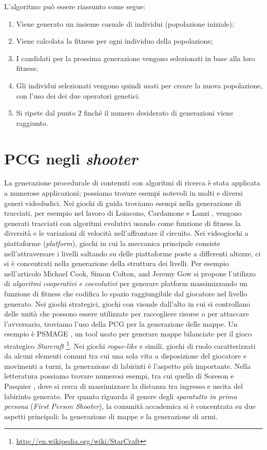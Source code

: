 \documentclass[12pt, italian]{toptesi}
\begin{document}
L'algoritmo può essere riassunto come segue:

\begin{enumerate}
 \item Viene generato un insieme casuale di individui (popolazione iniziale);
 \item Viene calcolata la fitness per ogni individuo della popolazione;
 \item I candidati per la prossima generazione vengono selezionati in base alla loro fitness;
 \item Gli individui selezionati vengono quindi usati per creare la nuova popolazione, con l'uso dei dei due operatori genetici.
 \item Si ripete dal punto 2 finché il numero desiderato di generazioni viene raggiunto.
\end{enumerate}

\section{PCG negli \emph{shooter}}

La generazione procedurale di contenuti con algoritmi di ricerca è stata applicata a numerose applicazioni; possiamo trovare esempi notevoli in molti e diversi generi videoludici.
Nei giochi di guida troviamo esempi nella generazione di tracciati, per esempio nel lavoro di Loiacono, Cardamone e Lanzi \cite{trackgen:article}, vengono generati tracciati con algoritmi evolutivi usando come funzione di fitness la diversità e le variazioni di velocità nell'affrontare il circuito.
Nei videogiochi a piattaforme (\emph{platform}), giochi in cui la meccanica principale consiste nell'attraversare i livelli saltando su delle piattaforme poste a differenti altezze, ci si è concentrati nella generazione della struttura dei livelli. Per esempio nell'articolo Michael Cook, Simon Colton, and Jeremy Gow\cite{platform:article} si propone l'utilizzo di \emph{algoritmi cooperativi e coevolutivi} per generare platform massimizzando un  funzione di fitness che codifica lo spazio raggiungibile dal giocatore nel livello generato.
Nei giochi strategici, giochi con visuale dall'alto in cui si controllano delle unità che possono essere utilizzate per raccogliere risorse o per attaccare l'avversario, troviamo l'uso della PCG per la generazione delle mappe. Un esempio è PSMAGE \cite{psmage:article}, un tool usato per generare mappe bilanciate per il gioco strategico \emph{Starcraft}
\footnote{\url{http://en.wikipedia.org/wiki/StarCraft}}.
Nei giochi \emph{rogue-like} e simili, giochi di ruolo caratterizzati da alcuni elementi comuni tra cui una sola vita a disposizione del giocatore e movimenti a turni, la generazione di labirinti è l'aspetto più importante. Nella letteratura possiamo trovare numerosi esempi, tra cui quello di Soreson e Pasquier \cite{dungeon:article}, dove si cerca di massimizzare la distanza tra ingresso e uscita del labirinto generato.
Per quanto riguarda il genere degli \emph{sparatutto in prima persona} (\emph{First Person Shooter}), la comunità accademica si è concentrata su due aspetti principali: la generazione di mappe e la generazione di armi.
\end{document}
